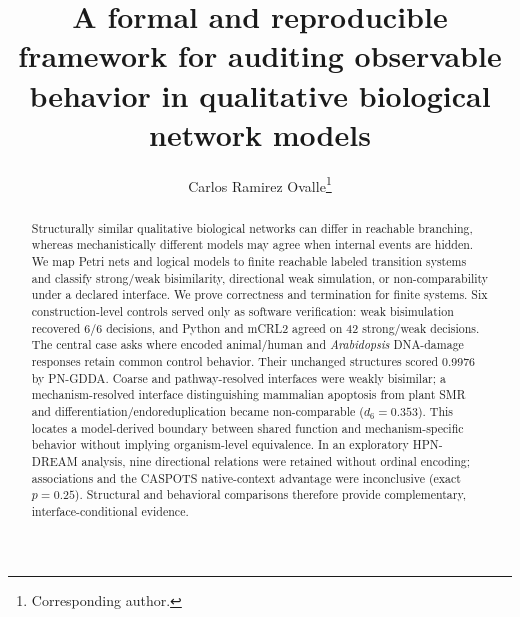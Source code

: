 \documentclass{ws-jbcb}
\numberwithin{equation}{section}
\begin{document}
\catchline{}{}{}{}{}

\title{A formal and reproducible framework for auditing observable behavior in
qualitative biological network models}

\author{Carlos Ramirez Ovalle\footnote{Corresponding author.}}

\address{Department of Natural Sciences and Mathematics, Pontificia Universidad
Javeriana Cali, Calle 18 No. 118-250, Via a Pance, Cali, Valle del Cauca,
Colombia\\
carlosovalle@javerianacali.edu.co}

\maketitle

\begin{abstract}
Structurally similar qualitative biological networks can differ in reachable
branching, whereas mechanistically different models may agree when internal
events are hidden. We map Petri nets and logical models to finite reachable
labeled transition systems and classify strong/weak bisimilarity, directional
weak simulation, or non-comparability under a declared interface. We prove
correctness and termination for finite systems. Six construction-level controls
served only as software verification: weak bisimulation recovered 6/6 decisions,
and Python and mCRL2 agreed on 42 strong/weak decisions. The central case asks
where encoded animal/human and \textit{Arabidopsis} DNA-damage responses retain
common control behavior. Their unchanged structures scored 0.9976 by PN-GDDA.
Coarse and pathway-resolved interfaces were weakly bisimilar; a
mechanism-resolved interface distinguishing mammalian apoptosis from plant SMR
and differentiation/endoreduplication became non-comparable ($d_6=0.353$). This
locates a model-derived boundary between shared function and mechanism-specific
behavior without implying organism-level equivalence. In an exploratory
HPN-DREAM analysis, nine directional relations were retained without ordinal
encoding; associations and the CASPOTS native-context advantage were
inconclusive (exact $p=0.25$). Structural and behavioral comparisons therefore
provide complementary, interface-conditional evidence.
\end{abstract}

\end{document}
